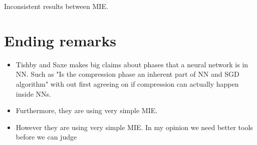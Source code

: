 \documentclass[dissertation.tex]{subfiles}
\begin{document}
Inconsistent results between MIE.

\section{Ending remarks}
 
\begin{itemize}
  \item{
      Tishby and Saxe makes big claims about phases that a neural network is in
      NN. Such as "Is the compression phase an inherent part of NN and SGD
      algorithm" with out first agreeing on if compression can actually happen
      inside NNs.
    }
  \item{
      Furthermore, they are using very simple MIE.
    }
  \item{
      However they are using very simple MIE. In my opinion we need better tools
      before we can judge 
    }
\end{itemize}
\end{document}
